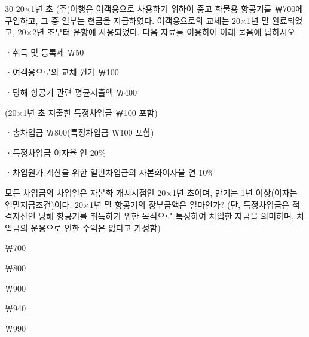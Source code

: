 \begin{question}{30}
20×1년 초 (주)여행은 여객용으로 사용하기 위하여 중고 화물용 항공기를 ￦700에 구입하고, 그 중 일부는 현금을 지급하였다. 여객용으로의 교체는 20×1년 말 완료되었고, 20×2년 초부터 운항에 사용되었다. 다음 자료를 이용하여 아래 물음에 답하시오.
\begin{framedtext}
ㆍ취득 및 등록세 ￦50 \par
ㆍ여객용으로의 교체 원가 ￦100 \par
ㆍ당해 항공기 관련 평균지출액 ￦400 \par
(20×1년 초 지출한 특정차입금 ￦100 포함) \par
ㆍ총차입금 ￦800(특정차입금 ￦100 포함) \par
ㆍ특정차입금 이자율 연 20\% \par
ㆍ차입원가 계산을 위한 일반차입금의 자본화이자율 연 10\% \par
\end{framedtext}
모든 차입금의 차입일은 자본화 개시시점인 20×1년 초이며, 만기는 1년 이상(이자는 연말지급조건)이다. 20×1년 말 항공기의 장부금액은 얼마인가? (단, 특정차입금은 적격자산인 당해 항공기를 취득하기 위한 목적으로 특정하여 차입한 자금을 의미하며, 차입금의 운용으로 인한 수익은 없다고 가정함) \par
\begin{choices}
  \item ￦700
  \item ￦800
  \item ￦900
  \item ￦940
  \item ￦990
\end{choices}
\end{question}

